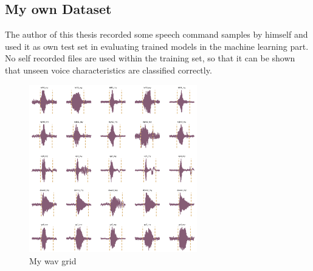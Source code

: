 
\subsection{My own Dataset}
The author of this thesis recorded some speech command samples by himself and used it as own test set in evaluating trained models in the machine learning part. No self recorded files are used within the training set, so that it can be shown that unseen voice characteristics are classified correctly.

\begin{figure}[!ht]
  \centering
    \includegraphics[width=0.65\textwidth]{./4_practice/figs/a_dataset/wav_grid_my}
  \caption{My wav grid}
  \label{fig:wav_grid_my}
\end{figure}
\FloatBarrier
\noindent
